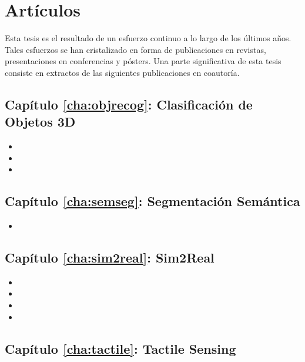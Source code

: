 \section{Artículos}

Esta tesis es el resultado de un esfuerzo continuo a lo largo de los últimos años. Tales esfuerzos se han cristalizado en forma de publicaciones en revistas, presentaciones en conferencias y pósters. Una parte significativa de esta tesis consiste en extractos de las siguientes publicaciones en coautoría.

\subsection{Capítulo \ref{cha:objrecog}: Clasificación de Objetos 3D}

\begin{itemize}
	\item {}
	\item {}
	\item {}
\end{itemize}

\subsection{Capítulo \ref{cha:semseg}: Segmentación Semántica}

\begin{itemize}
	\item {}
\end{itemize}

\subsection{Capítulo \ref{cha:sim2real}: Sim2Real}

\begin{itemize}
	\item {}
	\item {}
	\item {}
	\item {}
\end{itemize}

\subsection{Capítulo \ref{cha:tactile}: Tactile Sensing}

